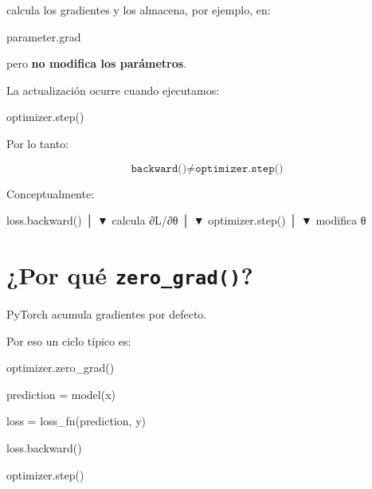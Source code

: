 \documentclass[
  letterpaper,
  DIV=11,
  numbers=noendperiod]{scrartcl}
\newenvironment{Shaded}{\begin{snugshade}}{\end{snugshade}}
\newcommand{\NormalTok}[1]{\textcolor[rgb]{0.00,0.23,0.31}{#1}}
\newcommand{\OperatorTok}[1]{\textcolor[rgb]{0.37,0.37,0.37}{#1}}
\begin{document}
calcula los gradientes y los almacena, por ejemplo, en:

\begin{Shaded}
\begin{Highlighting}[]
\NormalTok{parameter.grad}
\end{Highlighting}
\end{Shaded}

pero \textbf{no modifica los parámetros}.

La actualización ocurre cuando ejecutamos:

\begin{Shaded}
\begin{Highlighting}[]
\NormalTok{optimizer.step()}
\end{Highlighting}
\end{Shaded}

Por lo tanto:

\[
\boxed{
\texttt{backward()}
\neq
\texttt{optimizer.step()}
}
\]

Conceptualmente:

\begin{Shaded}
\begin{Highlighting}[]
\NormalTok{loss.backward()}
\NormalTok{        │}
\NormalTok{        ▼}
\NormalTok{calcula ∂L/∂θ}
\NormalTok{        │}
\NormalTok{        ▼}
\NormalTok{optimizer.step()}
\NormalTok{        │}
\NormalTok{        ▼}
\NormalTok{modifica θ}
\end{Highlighting}
\end{Shaded}

\section{\texorpdfstring{¿Por qué
\texttt{zero\_grad()}?}{¿Por qué zero\_grad()?}}\label{por-quuxe9-zero_grad}

PyTorch acumula gradientes por defecto.

Por eso un ciclo típico es:

\begin{Shaded}
\begin{Highlighting}[]
\NormalTok{optimizer.zero\_grad()}

\NormalTok{prediction }\OperatorTok{=}\NormalTok{ model(x)}

\NormalTok{loss }\OperatorTok{=}\NormalTok{ loss\_fn(prediction, y)}

\NormalTok{loss.backward()}

\NormalTok{optimizer.step()}
\end{Highlighting}
\end{Shaded}
\end{document}

